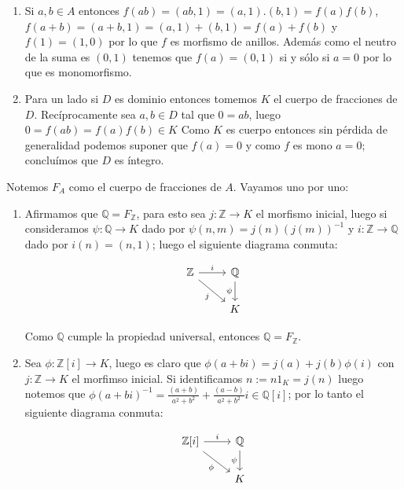 \documentclass[11pt]{article}
\newcommand{\Q}{\mathbb{Q}}
\newcommand{\Z}{\mathbb{Z}}
\newenvironment{proof}[1][Demostraci\'on]{\begin{trivlist}
		\item[\hskip \labelsep {\bfseries #1}]}{\end{trivlist}}
\newcommand{\qed}{\nobreak \ifvmode \relax \else
	\ifdim\lastskip<1.5em \hskip-\lastskip
	\hskip1.5em plus0em minus0.5em \fi \nobreak
	\vrule height0.75em width0.5em depth0.25em\fi}
\begin{document}
\begin{enumerate}
\begin{proof}
\begin{enumerate}
			\item Si $a,b \in A$ entonces $f(ab) = (ab,1) = (a,1).(b,1) = f(a)f(b)$, $f(a+b)=(a+b,1)=(a,1)+(b,1)=f(a) + f(b)$ y $f(1)=(1,0)$ por lo que $f$ es morfismo de anillos. Adem\'as como el neutro de la suma es $(0,1)$ tenemos que $f(a)=(0,1)$ si y s\'olo si $a=0$ por lo que es monomorfismo.
			
			\item Para un lado si $D$ es dominio entonces tomemos $K$ el cuerpo de fracciones de $D$. Rec\'iprocamente sea $a,b \in D$ tal que $0 = ab$, luego $0 = f(ab)=f(a)f(b) \in K$ Como $K$ es cuerpo entonces sin p\'erdida de generalidad podemos suponer que $f(a) = 0$ y como $f$ es mono $a = 0$; conclu\'imos que $D$ es \'integro.\qed
			
		\end{enumerate}
		
	\end{proof}
	
	\item Notemos $F_A$ como el cuerpo de fracciones de $A$. Vayamos uno por uno:
	
	\begin{enumerate}
		
		\item Afirmamos que $\Q = F_{\Z}$, para esto sea $j: \Z \rightarrow K$ el morfismo inicial, luego si consideramos $\psi : \Q \rightarrow K$ dado por $\psi(n,m) = j(n)(j(m))^{-1}$ y $i: \Z \rightarrow \Q$ dado por $i(n)=(n,1)$; luego el siguiente diagrama conmuta:
		
			\begin{equation*}
			\begin{tikzcd}
			\Z \arrow[swap] {dr} {j} \arrow{r} {i}   & \Q \arrow[swap] {d} {\psi} \\
			 & K 
			\end{tikzcd}
			\end{equation*}		
			
		Como $\Q$ cumple la propiedad universal, entonces $\Q = F_{\Z}$.
		
		\item Sea $\phi: \Z[i] \rightarrow K$, luego es claro que $\phi(a+bi) = j(a) + j(b)\phi(i)$ con $j : \Z \rightarrow K$ el morfimso inicial. Si identificamos $n := n 1_K = j(n)$ luego notemos que $\phi(a+bi)^{-1} = \frac{(a + b)}{a^2 + b^2} + \frac{(a - b)}{a^2 + b^2}i \in \Q[i]$; por lo tanto el siguiente diagrama conmuta:
		
			\begin{equation*}
			\begin{tikzcd}
			\Z[i] \arrow[swap] {dr} {\phi} \arrow{r} {i}   & \Q \arrow[swap] {d} {\psi} \\
			& K 
			\end{tikzcd}
			\end{equation*}			
		

\end{enumerate}
\end{enumerate}
\end{document}
